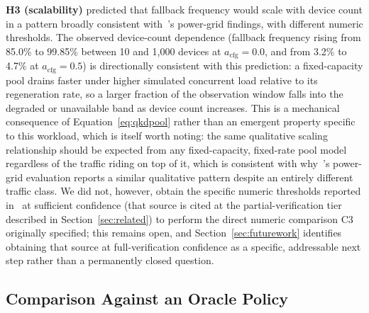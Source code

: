 \documentclass[journal]{IEEEtran}
\newcommand{\acfg}{\ensuremath{a_{\text{cfg}}}}
\begin{document}
\textbf{H3 (scalability)} predicted that fallback frequency would scale with device count in a pattern broadly consistent with~\cite{zhu2025technoeconomic}'s power-grid findings, with different numeric thresholds. The observed device-count dependence (fallback frequency rising from 85.0\% to 99.85\% between 10 and 1{,}000 devices at $\acfg=0.0$, and from 3.2\% to 4.7\% at $\acfg=0.5$) is directionally consistent with this prediction: a fixed-capacity pool drains faster under higher simulated concurrent load relative to its regeneration rate, so a larger fraction of the observation window falls into the degraded or unavailable band as device count increases. This is a mechanical consequence of Equation~\eqref{eq:qkdpool} rather than an emergent property specific to this workload, which is itself worth noting: the same qualitative scaling relationship should be expected from any fixed-capacity, fixed-rate pool model regardless of the traffic riding on top of it, which is consistent with why~\cite{zhu2025technoeconomic}'s power-grid evaluation reports a similar qualitative pattern despite an entirely different traffic class. We did not, however, obtain the specific numeric thresholds reported in~\cite{zhu2025technoeconomic} at sufficient confidence (that source is cited at the partial-verification tier described in Section~\ref{sec:related}) to perform the direct numeric comparison C3 originally specified; this remains open, and Section~\ref{sec:futurework} identifies obtaining that source at full-verification confidence as a specific, addressable next step rather than a permanently closed question.

\subsection{Comparison Against an Oracle Policy}
\end{document}
